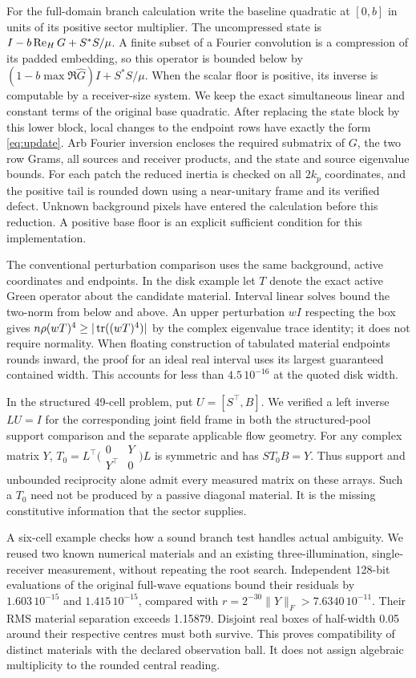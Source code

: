 For the full-domain branch calculation write the baseline quadratic at $[0,b]$ in units of its positive sector multiplier. The uncompressed state is $I-b\operatorname{Re}_{H} G+S^*S/\mu$. A finite subset of a Fourier convolution is a compression of its padded embedding, so this operator is bounded below by $(1-b\max\Re\widehat G)I+S^*S/\mu$. When the scalar floor is positive, its inverse is computable by a receiver-size system. We keep the exact simultaneous linear and constant terms of the original base quadratic. After replacing the state block by this lower block, local changes to the endpoint rows have exactly the form \eqref{eq:update}. Arb Fourier inversion encloses the required submatrix of $G$, the two row Grams, all sources and receiver products, and the state and source eigenvalue bounds. For each patch the reduced inertia is checked on all $2k_p$ coordinates, and the positive tail is rounded down using a near-unitary frame and its verified defect. Unknown background pixels have entered the calculation before this reduction. A positive base floor is an explicit sufficient condition for this implementation.

The conventional perturbation comparison uses the same background, active coordinates and endpoints. In the disk example let $T$ denote the exact active Green operator about the candidate material. Interval linear solves bound the two-norm from below and above. An upper perturbation $wI$ respecting the box gives $n\rho(wT)^4\ge|\operatorname{tr}((wT)^4)|$ by the complex eigenvalue trace identity; it does not require normality. When floating construction of tabulated material endpoints rounds inward, the proof for an ideal real interval uses its largest guaranteed contained width. This accounts for less than $4.5\,10^{-16}$ at the quoted disk width.

In the structured 49-cell problem, put $U=[S^\top,B]$. We verified a left inverse $LU=I$ for the corresponding joint field frame in both the structured-pool support comparison and the separate applicable flow geometry. For any complex matrix $Y$, $T_0=L^\top\bigl(\begin{smallmatrix}0&Y\\Y^\top&0\end{smallmatrix}\bigr)L$ is symmetric and has $ST_0B=Y$. Thus support and unbounded reciprocity alone admit every measured matrix on these arrays. Such a $T_0$ need not be produced by a passive diagonal material. It is the missing constitutive information that the sector supplies.

A six-cell example checks how a sound branch test handles actual ambiguity. We reused two known numerical materials and an existing three-illumination, single-receiver measurement, without repeating the root search. Independent 128-bit evaluations of the original full-wave equations bound their residuals by $1.603\,10^{-15}$ and $1.415\,10^{-15}$, compared with $r=2^{-30}\|Y\|_F>7.6340\,10^{-11}$. Their RMS material separation exceeds 1.15879. Disjoint real boxes of half-width 0.05 around their respective centres must both survive. This proves compatibility of distinct materials with the declared observation ball. It does not assign algebraic multiplicity to the rounded central reading.


